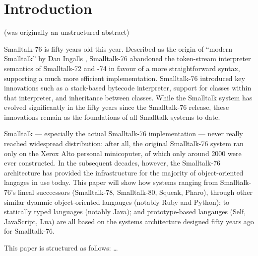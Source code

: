 \section{Introduction}

(was originally an unstructured abstract)



Smalltalk-76 is fifty years old this year. Described as the origin of
“modern Smalltalk” by Dan Ingalls \cite{ingalls-hopl2020},
Smalltalk-76 abandoned the token-stream interpreter semantics of
Smalltalk-72 and -74 in favour of a more straightforward syntax,
supporting a much more efficient implememtation. Smalltalk-76
introduced key innovations such as a stack-based bytecode interpreter,
support for classes within that interpreter, and inheritance between
classes. While the Smalltalk system has evolved significantly in the
fifty years since the Smalltalk-76 release, these innovations remain
as the foundations of all Smalltalk systems to date.

Smalltalk — especially the actual Smalltalk-76 implementation — never
really reached widespread distribution: after all, the original
Smalltalk-76 system ran only on the Xerox Alto personal minicoputer,
of which only around 2000 were ever constructed. In the subsequent
decades, however, the Smalltalk-76 architecture has provided the
infrastructure for the majority of object-oriented langages in use
today. This paper will show how systems ranging from Smalltalk-76’s
lineal succecssors (Smalltalk-78, Smalltalk-80, Squeak, Pharo),
through other similar dyanmic object-oriented langauges (notably Ruby
and Python); to statically typed languages (notably Java); and
prototype-based langauges (Self, JavaScript, Lua) are all based on the
systems architecture designed fifty years ago for Smalltalk-76.

This paper is structured as follows: \ldots

